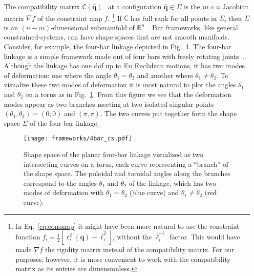 The compatibility matrix $\mathsf{C}(\bar{\bm{q}})$~\cite{pellegrino1986,lubensky2015} at a configuration $\bar{\bm{q}} \in \Sigma$ is the $m \times n$ Jacobian matrix $\nabla f$ of the constraint map $f$.%
\footnote{In Eq.~\eqref{eq:consmap} it might have been more natural to use the constraint function $f_{i} = \frac{1}{2}[\ell_{i}^{2}(\bm{q}) - \bar{\ell}_{i}^{2}]$, without the $\bar{\ell}_{i}^{-1}$ factor.  This would have made $\nabla f$ the rigidity matrix instead of the compatibility matrix.  For our purposes, however, it is more convenient to work with the compatibility matrix as its entries are dimensionless.}
If $\mathsf{C}$ has full rank for all points in $\Sigma$, then $\Sigma$ is an $(n - m)$-dimensional submanifold of $\mathbb{R}^{n}$~\cite{leimkuhler2005,lee2013}.
But frameworks, like general constrained-systems, can have shape spaces that are not smooth manifolds.
Consider, for example, the four-bar linkage depicted in Fig.~\ref{fig:4bar_cs}.
The four-bar linkage is a simple framework made out of four bars with freely rotating joints~\cite{grashof1883,hartenberg1964,shimamoto2005}.
Although the linkage has one \ac{dof} up to Eu Euclidean motions,
it has two modes of deformation: one where the angle $\theta_1 = \theta_2$ and another where $\theta_1 \ne \theta_2$.
To visualize these two modes of deformation it is most natural to plot the angles $\theta_{1}$ and $\theta_{2}$ on a torus as in Fig.~\ref{fig:4bar_cs}.
From this figure we see that the deformation modes appear as two branches meeting at two isolated singular points $(\theta_1,\theta_2) = (0,0)$ and $(\pi,\pi)$.
The two curves put together form the shape space $\Sigma$ of the four-bar linkage.
%
\begin{figure}
  \begin{center}
    \texttt{[image: frameworks/4bar\_cs.pdf]}
  \end{center}
  \caption{Shape space of the planar four-bar linkage visualized as two intersecting curves on a torus, each curve representing a ``branch'' of the shape space.
    The poloidal and toroidal angles along the branches correspond to the angles $\theta_1$ and $\theta_2$ of the linkage, which has two modes of deformation with $\theta_{1} = \theta_{2}$ (blue curve) and $\theta_{1} \ne \theta_{2}$ (red curve).}
  \label{fig:4bar_cs}
\end{figure}
\label{page:4bar}

